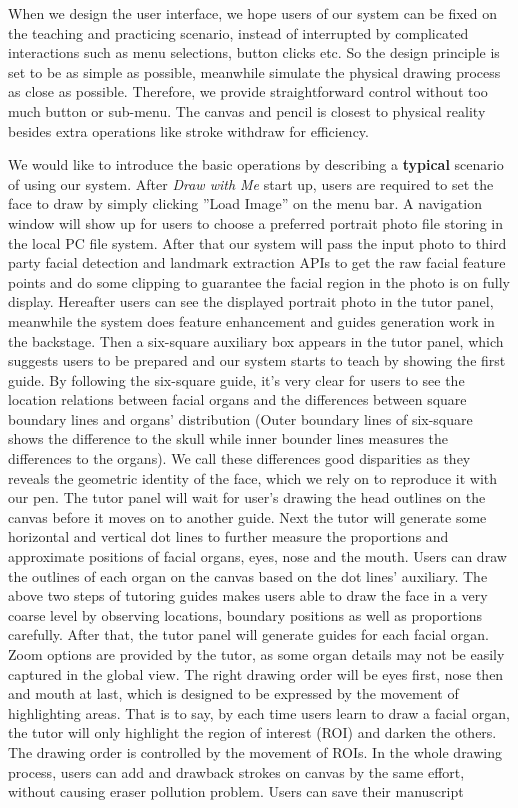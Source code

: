 		When we design the user interface, we hope users of our system can be fixed on the teaching and practicing scenario, instead of interrupted by complicated interactions such as menu selections, button clicks etc. So the design principle is set to be as simple as possible, meanwhile simulate the physical drawing process as close as possible. Therefore, we provide straightforward control without too much button or sub-menu. The canvas and pencil is closest to physical reality besides extra operations like stroke withdraw for efficiency.
			
		
		We would like to introduce the basic operations by describing a \textbf{typical} scenario of using our system. After \textit{Draw with Me} start up, users are required to set the face to draw by simply clicking ''Load Image'' on the menu bar. A navigation window will show up for users to choose a preferred portrait photo file storing in the local PC file system. After that our system will pass the input photo to third party  facial detection and landmark extraction APIs to get the raw facial feature points and do some clipping to guarantee the facial region in the photo is on fully display. Hereafter users can see the displayed portrait photo in the tutor panel, meanwhile the system does feature enhancement and guides generation work in the backstage. Then a six-square auxiliary box appears in the tutor panel, which suggests users to be prepared and our system starts to teach by showing the first guide. By following the six-square guide, it's very clear for users to see the location relations between facial organs and the differences between square boundary lines and organs' distribution (Outer boundary lines of six-square shows the difference to the skull while inner bounder lines measures the differences to the organs). We call these differences good disparities as they reveals the geometric identity of the face, which we rely on to reproduce it with our pen. The tutor panel will wait for user's drawing the head outlines on the canvas before it moves on to another guide. Next the tutor will generate some horizontal and vertical dot lines to further measure the proportions and approximate positions of facial organs, eyes, nose and the mouth. Users can draw the outlines of each organ on the canvas based on the dot lines' auxiliary. The above two steps of tutoring guides makes users able to draw the face in a very coarse level by observing locations, boundary positions as well as proportions carefully. After that, the tutor panel will generate guides for each facial organ. Zoom options are provided by the tutor, as some organ details may not be easily captured in the global view. The right drawing order will be eyes first, nose then and mouth at last, which is designed to be expressed by the movement of highlighting areas. That is to say, by each time users learn to draw a facial organ, the tutor will only highlight the region of interest (ROI) and darken the others. The drawing order is controlled by the movement of ROIs. In the whole drawing process, users can add and drawback strokes on canvas by the same effort, without causing eraser pollution problem. Users can save their manuscript 